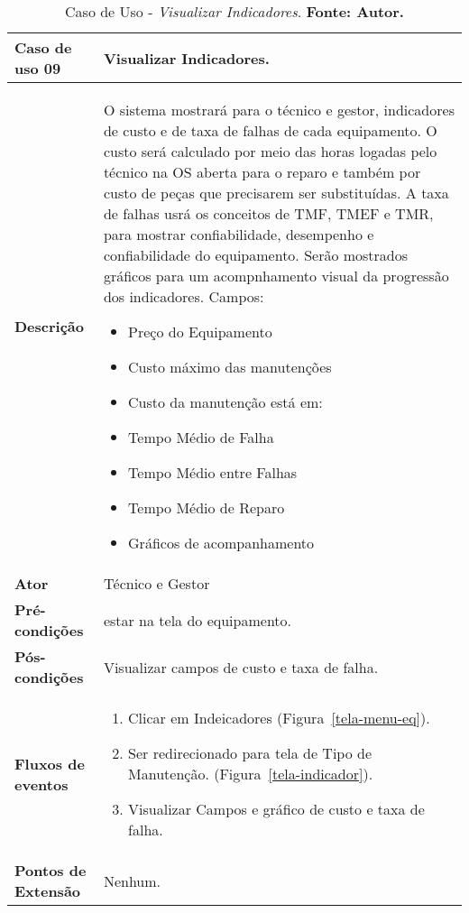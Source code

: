 \begin{apendicesenv}
\begin{table}[H]
\centering
\caption{Caso de Uso - \textit{Visualizar Indicadores}. \textbf{Fonte: Autor.}}
\label{uc09}
\begin{tabular}{ | p{5cm} | p{10cm} |  }
\hline
	\textbf{Caso de uso 09} & Visualizar Indicadores. \\ \hline
	\textbf{Descrição} & O sistema mostrará para o técnico e gestor, indicadores de custo e de taxa de falhas de cada equipamento. O custo será calculado por meio das horas logadas pelo técnico na OS aberta para o reparo e também por custo de peças que precisarem ser substituídas. A taxa de falhas usrá os conceitos de TMF, TMEF e TMR, para mostrar confiabilidade, desempenho e confiabilidade do equipamento. Serão mostrados gráficos para um acompnhamento visual da progressão dos indicadores. Campos: \begin{itemize}
															                    \item Preço do Equipamento
															                    \item Custo máximo das manutenções
															                    \item Custo da manutenção está em:
															                    \item Tempo Médio de Falha 
															                    \item Tempo Médio entre Falhas
															                    \item Tempo Médio de Reparo
															                    \item Gráficos de acompanhamento
															                    \end{itemize} \\ \hline
	\textbf{Ator} & Técnico e Gestor \\ \hline
	\textbf{Pré-condições} & estar na tela do equipamento. \\ \hline
	\textbf{Pós-condições} & Visualizar campos de custo e taxa de falha. \\ \hline
	\textbf{Fluxos de eventos} & \begin{enumerate}
									\item Clicar em Indeicadores (Figura~\ref{tela-menu-eq}).    								
									\item Ser redirecionado para tela de Tipo de Manutenção. (Figura~\ref{tela-indicador}).
									\item Visualizar Campos e gráfico de custo e taxa de falha.
								 \end{enumerate}   \\ \hline
	\textbf{Pontos de Extensão} & Nenhum. \\ \hline
\end{tabular}
\end{table}


\end{apendicesenv}
